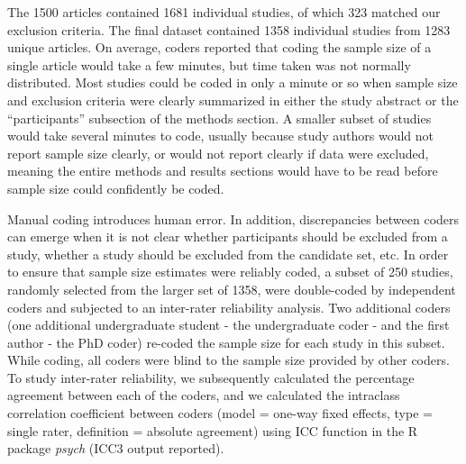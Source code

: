 \documentclass[
  english,
  man,floatsintext]{apa6}
\begin{document}
The 1500 articles contained 1681 individual studies, of which 323 matched our exclusion criteria. The final dataset contained 1358 individual studies from 1283 unique articles. On average, coders reported that coding the sample size of a single article would take a few minutes, but time taken was not normally distributed. Most studies could be coded in only a minute or so when sample size and exclusion criteria were clearly summarized in either the study abstract or the ``participants'' subsection of the methods section. A smaller subset of studies would take several minutes to code, usually because study authors would not report sample size clearly, or would not report clearly if data were excluded, meaning the entire methods and results sections would have to be read before sample size could confidently be coded.

Manual coding introduces human error. In addition, discrepancies between coders can emerge when it is not clear whether participants should be excluded from a study, whether a study should be excluded from the candidate set, etc. In order to ensure that sample size estimates were reliably coded, a subset of 250 studies, randomly selected from the larger set of 1358, were double-coded by independent coders and subjected to an inter-rater reliability analysis. Two additional coders (one additional undergraduate student - the undergraduate coder - and the first author - the PhD coder) re-coded the sample size for each study in this subset. While coding, all coders were blind to the sample size provided by other coders. To study inter-rater reliability, we subsequently calculated the percentage agreement between each of the coders, and we calculated the intraclass correlation coefficient between coders (model = one-way fixed effects, type = single rater, definition = absolute agreement) using ICC function in the R package \emph{psych} (ICC3 output reported).
\end{document}
